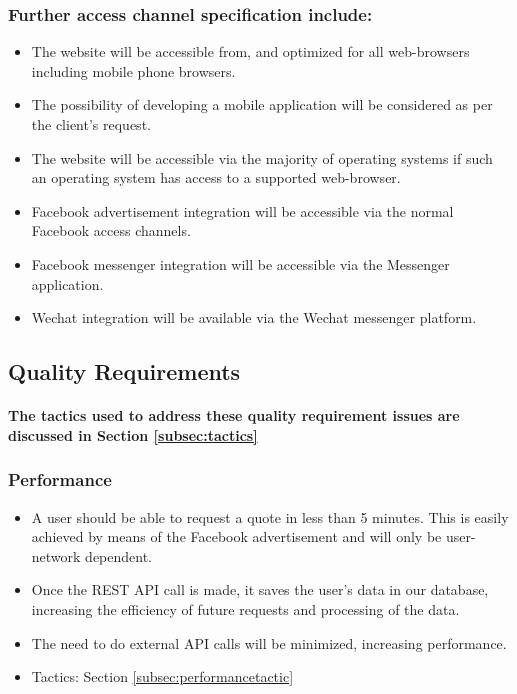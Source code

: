 \documentclass{article}
\begin{document}
\subsubsection{Further access channel specification include:}
	\begin{itemize}
		\item The website will be accessible from, and optimized for all web-browsers including mobile phone browsers.
		\item The possibility of developing a mobile application will be considered as per the client's request.
		\item The website will be accessible via the majority of operating systems if such an operating system has access to a supported web-browser.
		\item Facebook advertisement integration will be accessible via the normal Facebook access channels.
		\item Facebook messenger integration will be accessible via the Messenger application.
		\item Wechat integration will be available via the Wechat messenger platform.
	\end{itemize}


	\subsection{Quality Requirements}
		\paragraph{The tactics used to address these quality requirement issues are discussed in Section \ref{subsec:tactics}}
		\subsubsection{Performance}
		\begin{itemize}
			\item A user should be able to request a quote in less than 5 minutes. This is easily achieved by means of the Facebook advertisement and will only be user-network dependent.
			\item Once the REST API call is made, it saves the user's data in our database, increasing the efficiency of future requests and processing of the data.
			\item The need to do external API calls will be minimized, increasing performance.
			\item Tactics: Section \ref{subsec:performancetactic}
		\end{itemize}
\end{document}
